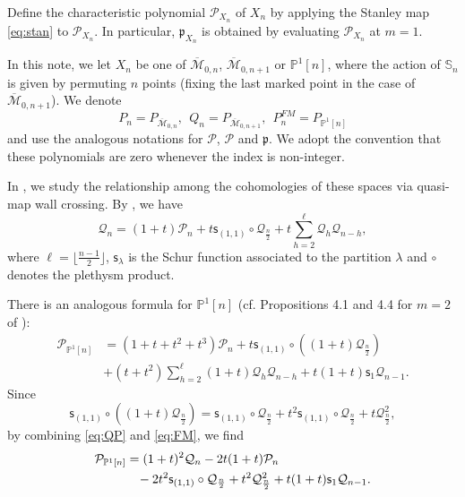 \documentclass[11pt,letterpaper]{amsart}
\numberwithin{equation}{section}
\theoremstyle{definition}
\newcommand{\PP}{\mathbb{P}}
\newcommand{\cal}{\mathcal}
\def\cM{{\cal M}}
\def\cP{{\cal P}}
\def\cQ{{\cal Q}}
\def\fp{\mathfrak{p}}
\def\mzn{\overline{\cM}_{0,n} }
\def\mzno{\overline{\cM}_{0,n+1} }
\def\beq{\begin{equation}}
\def\eeq{\end{equation}}
\def\sfs{\mathsf{s}}
\def\charP{\mathscr{P}}
\def\symS{\mathbb{S}}
\begin{document}
Define the characteristic polynomial $\charP_{X_n}$ of $X_n$ by applying the Stanley map \eqref{eq:stan} to $\cP_{X_n}$. In particular, $\fp_{X_n}$ is obtained by evaluating $\charP_{X_n}$ at $m=1$.

In this note, we let $X_n$ be one of $\mzn$, $\mzno$ or $\PP^1[n]$, where the action of $\symS_n$ is given by permuting $n$ points (fixing the last marked point in the case of $\mzno$). We denote
\[P_n=P_{\mzn},  \ \ Q_n=P_{\mzno},\ \  P^{FM}_n=P_{\PP^1[n]}\]
and use the analogous notations for $\cP$, $\charP$ and $\fp$. We adopt the convention that these polynomials are zero whenever the index is non-integer.

In \cite{CKL2}, we study the relationship among the cohomologies of these spaces via quasi-map wall crossing. By \cite[Theorem 4.8]{CKL2}, we have
\beq\label{eq:QP} \cQ_n = (1+t)\cP_n + t \sfs_{(1,1)}\circ \cQ_{\frac{n}{2}} + t \sum_{h=2}^\ell \cQ_h \cQ_{n-h},
\eeq
where $\ell = \lfloor \frac{n-1}{2}\rfloor$, $\sfs_\lambda$ is the Schur function associated to the partition $\lambda$ and $\circ$ denotes the plethysm product.

There is an analogous formula for $\PP^1[n]$ (cf. Propositions 4.1 and 4.4 for $m=2$ of \cite{CKL2}):
\beq\label{eq:FM}
\begin{split}
\cP_{\PP^1[n]} &= (1+t+t^2+t^3)\cP_n + t \sfs_{(1,1)}\circ \left( (1+t) \cQ_{\frac{n}{2}}\right)\\
& + (t+t^2) \sum_{h=2}^\ell (1+t)\cQ_h \cQ_{n-h} + t (1+t)\sfs_1 \cQ_{n-1}.
\end{split}
\eeq
Since
\[
\sfs_{(1,1)}\circ \left( (1+t) \cQ_{\frac{n}{2}}\right)= \sfs_{(1,1)}\circ\cQ_{\frac{n}{2}} + t^2 \sfs_{(1,1)}\circ\cQ_{\frac{n}{2}}+t \cQ_{\frac{n}{2}}^2,
\]
by combining \eqref{eq:QP} and \eqref{eq:FM}, we find
\beq\label{eq:FMrep}
\begin{split}
 \cP_{\PP^1[n]} & =   (1+t)^2\cQ_n -2t(1+t)\cP_n \\ & \hspace{2ex}-2t^2 \sfs_{(1,1)}\circ  \cQ_{\frac{n}{2}} +
t^2 \cQ_{\frac{n}{2}}^2 + t(1+t) \sfs_1 \cQ_{n-1}.
\end{split}
\eeq
\end{document}
